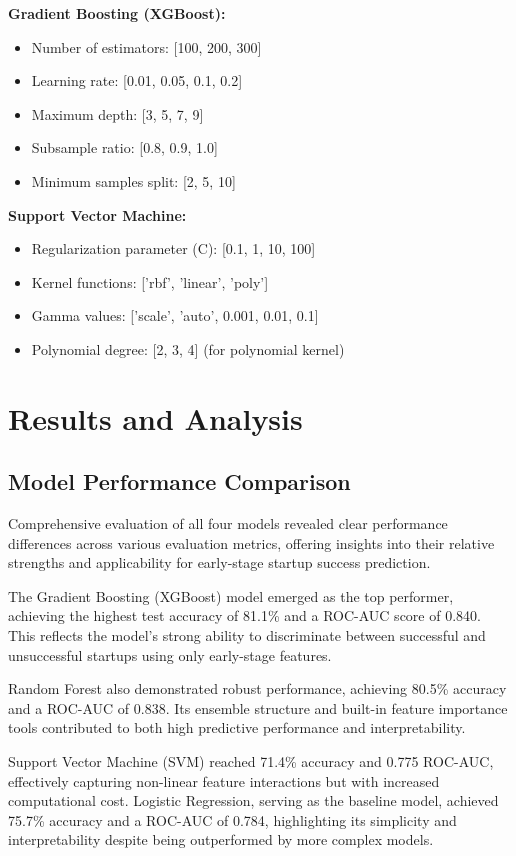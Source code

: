 \documentclass[conference]{IEEEtran}
\begin{document}
\textbf{Gradient Boosting (XGBoost):}
\begin{itemize}
    \item Number of estimators: [100, 200, 300]
    \item Learning rate: [0.01, 0.05, 0.1, 0.2]
    \item Maximum depth: [3, 5, 7, 9]
    \item Subsample ratio: [0.8, 0.9, 1.0]
    \item Minimum samples split: [2, 5, 10]
\end{itemize}

\textbf{Support Vector Machine:}
\begin{itemize}
    \item Regularization parameter (C): [0.1, 1, 10, 100]
    \item Kernel functions: ['rbf', 'linear', 'poly']
    \item Gamma values: ['scale', 'auto', 0.001, 0.01, 0.1]
    \item Polynomial degree: [2, 3, 4] (for polynomial kernel)
\end{itemize}

\section{Results and Analysis}

\subsection{Model Performance Comparison}

Comprehensive evaluation of all four models revealed clear performance differences across various evaluation metrics, offering insights into their relative strengths and applicability for early-stage startup success prediction.

The Gradient Boosting (XGBoost) model emerged as the top performer, achieving the highest test accuracy of 81.1\% and a ROC-AUC score of 0.840. This reflects the model’s strong ability to discriminate between successful and unsuccessful startups using only early-stage features.

Random Forest also demonstrated robust performance, achieving 80.5\% accuracy and a ROC-AUC of 0.838. Its ensemble structure and built-in feature importance tools contributed to both high predictive performance and interpretability.

Support Vector Machine (SVM) reached 71.4\% accuracy and 0.775 ROC-AUC, effectively capturing non-linear feature interactions but with increased computational cost. Logistic Regression, serving as the baseline model, achieved 75.7\% accuracy and a ROC-AUC of 0.784, highlighting its simplicity and interpretability despite being outperformed by more complex models.
\end{document}
